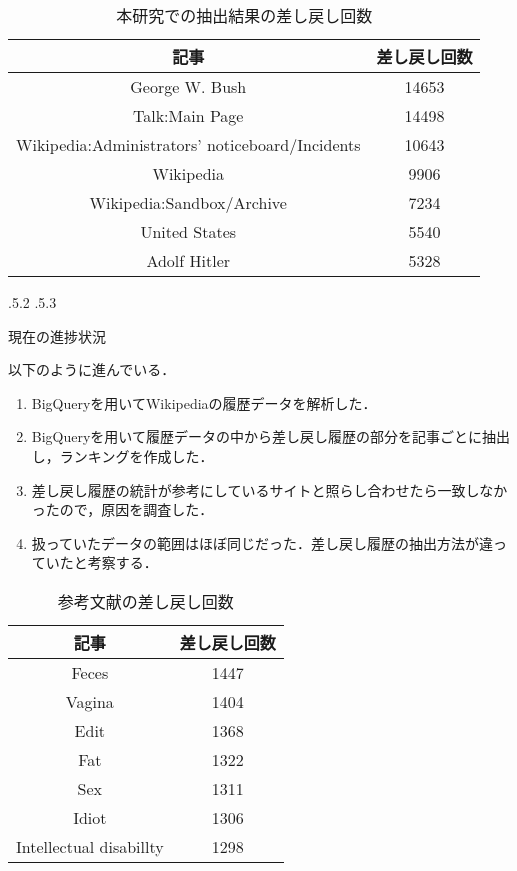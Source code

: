 \documentclass[uplatex]{jsarticle}
\makeatletter
\renewcommand{\section}{%
    \if@slide\clearpage\fi
    \@startsection{section}{1}{\z@}%
    {\Cvs \@plus.5\Cdp \@minus.2\Cdp}%
    {.5\Cvs \@plus.3\Cdp}%
    {\normalfont\raggedright}}
\makeatother
\begin{document}
\begin{wraptable}[10]{r}{10cm}
\vspace*{-\intextsep}
\caption{本研究での抽出結果の差し戻し回数}\label{サンプル表}
\begin{tabular}{|c|c|}
\hline
記事 & 差し戻し回数\\
\hline
George W. Bush & 14653\\
Talk:Main Page & 14498\\
Wikipedia:Administrators' noticeboard/Incidents & 10643\\
Wikipedia & 9906\\
Wikipedia:Sandbox/Archive & 7234\\
United States & 5540\\
Adolf Hitler & 5328\\
\hline
\end{tabular}
\end{wraptable}




\section{現在の進捗状況}

以下のように進んでいる．

\begin{enumerate}
\item BigQueryを用いてWikipediaの履歴データを解析した．
\item BigQueryを用いて履歴データの中から差し戻し履歴の部分を記事ごとに抽出し，ランキングを作成した．
\item 差し戻し履歴の統計が参考にしているサイトと照らし合わせたら一致しなかったので，原因を調査した．
\item 扱っていたデータの範囲はほぼ同じだった．差し戻し履歴の抽出方法が違っていたと考察する．
\end{enumerate}


\begin{wraptable}[7]{r}{6cm}
\vspace*{-\intextsep}
\caption{参考文献の差し戻し回数}\label{サンプル表}
\begin{tabular}{|c|c|}
\hline
記事 & 差し戻し回数\\
\hline
Feces & 1447\\
Vagina & 1404\\
Edit & 1368\\
Fat & 1322\\
Sex & 1311\\
Idiot & 1306\\
Intellectual disabillty & 1298\\
\hline
\end{tabular}
\end{wraptable}
\end{document}
